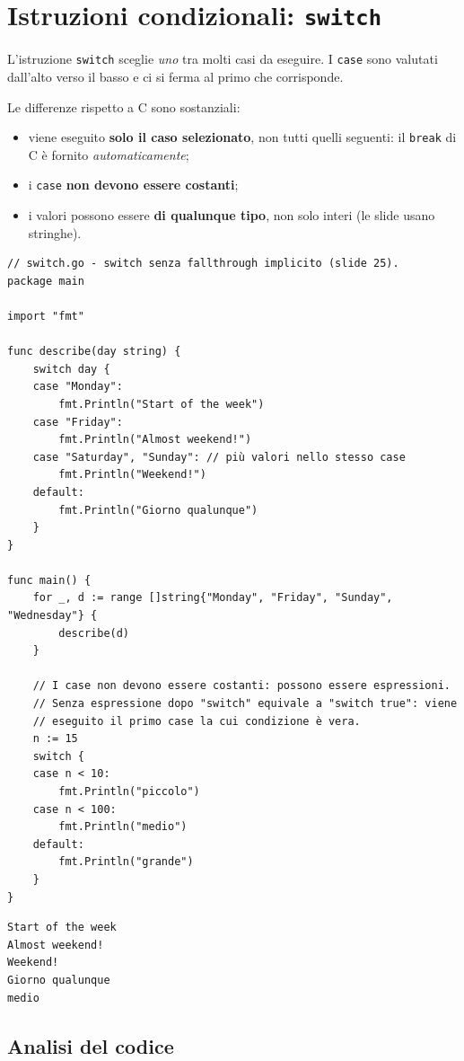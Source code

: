 \documentclass[11pt,a4paper]{report}
\newcommand{\cod}[1]{\texttt{#1}}
\begin{document}
\section{Istruzioni condizionali: \texttt{switch}}\label{sec:switch}

L'istruzione \cod{switch} sceglie \emph{uno} tra molti casi da eseguire. I
\cod{case} sono valutati dall'alto verso il basso e ci si ferma al primo che
corrisponde.

Le differenze rispetto a C sono sostanziali:

\begin{itemize}
  \item viene eseguito \textbf{solo il caso selezionato}, non tutti quelli
        seguenti: il \cod{break} di C è fornito \emph{automaticamente};
  \item i \cod{case} \textbf{non devono essere costanti};
  \item i valori possono essere \textbf{di qualunque tipo}, non solo interi
        (le slide usano stringhe).
\end{itemize}

\begin{lstlisting}[style=gocode,caption={\texttt{03\_control\_flow/switch.go}}]
// switch.go - switch senza fallthrough implicito (slide 25).
package main

import "fmt"

func describe(day string) {
	switch day {
	case "Monday":
		fmt.Println("Start of the week")
	case "Friday":
		fmt.Println("Almost weekend!")
	case "Saturday", "Sunday": // più valori nello stesso case
		fmt.Println("Weekend!")
	default:
		fmt.Println("Giorno qualunque")
	}
}

func main() {
	for _, d := range []string{"Monday", "Friday", "Sunday", "Wednesday"} {
		describe(d)
	}

	// I case non devono essere costanti: possono essere espressioni.
	// Senza espressione dopo "switch" equivale a "switch true": viene
	// eseguito il primo case la cui condizione è vera.
	n := 15
	switch {
	case n < 10:
		fmt.Println("piccolo")
	case n < 100:
		fmt.Println("medio")
	default:
		fmt.Println("grande")
	}
}
\end{lstlisting}
\begin{lstlisting}[style=output]
Start of the week
Almost weekend!
Weekend!
Giorno qualunque
medio
\end{lstlisting}

\subsection{Analisi del codice}
\end{document}
